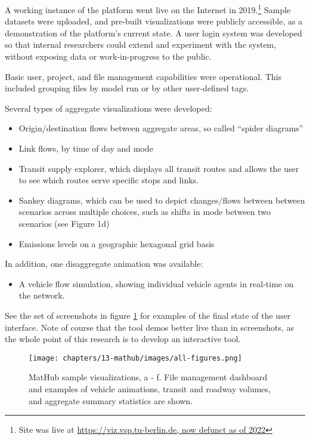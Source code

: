 A working instance of the platform went live on the Internet in 2019.\footnote{Site was live at \url{https://viz.vsp.tu-berlin.de, now defunct as of 2022}} Sample datasets were uploaded, and pre-built visualizations were publicly accessible, as a demonstration of the platform's current state. A user login system was developed so that internal researchers could extend and experiment with the system, without exposing data or work-in-progress to the public.

Basic user, project, and file management capabilities were operational. This included grouping files by model run or by other user-defined tags.

Several types of aggregate visualizations were developed:

\begin{itemize}
\tightlist
\item
  Origin/destination flows between aggregate areas, so called ``spider
  diagrams''
\item
  Link flows, by time of day and mode
\item
  Transit supply explorer, which displays all transit routes and allows
  the user to see which routes serve specific stops and links.
\item
  Sankey diagrams, which can be used to depict changes/flows between
  between scenarios across multiple choices, such as shifts in mode
  between two scenarios (see Figure 1d)
\item
  Emissions levels on a geographic hexagonal grid basis
\end{itemize}

In addition, one disaggregate animation was available:

\begin{itemize}
\tightlist
\item
  A vehicle flow simulation, showing individual vehicle agents in
  real-time on the network.
\end{itemize}

See the set of screenshots in figure \ref{fig:mathub-examples} for examples of the final state of the user interface. Note of course that the tool demos better live than in screenshots, as the whole point of this research is to develop an interactive tool.

\begin{figure}
  \centering
	\begin{minipage}{1.0\textwidth}
  \texttt{[image: chapters/13-mathub/images/all-figures.png]}
  \caption{MatHub sample visualizations, a - f. File management dashboard and examples of vehicle animations, transit and roadway volumes, and aggregate summary statistics are shown.}
  \label{fig:mathub-examples}
	\end{minipage}
\end{figure}

